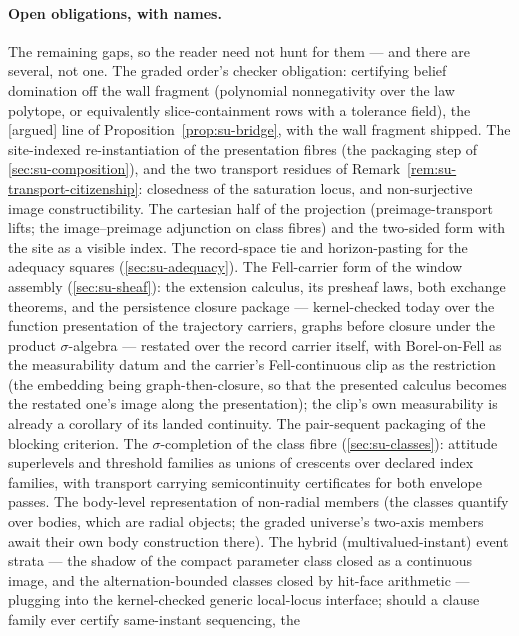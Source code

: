 \paragraph{Open obligations, with names.} The remaining gaps, so
the reader
need not hunt for them --- and there are several, not one. The
graded order's checker obligation: certifying belief domination
off the wall fragment (polynomial nonnegativity over the law
polytope, or equivalently slice-containment rows with a tolerance
field), the [argued] line of Proposition~\ref{prop:su-bridge},
with the wall fragment shipped. The site-indexed re-instantiation
of the presentation fibres (the packaging step of
\autoref{sec:su-composition}), and the two transport residues
of
Remark~\ref{rem:su-transport-citizenship}: closedness of the
saturation locus, and non-surjective image
constructibility. The cartesian half of the projection
(preimage-transport lifts; the image--preimage adjunction on class
fibres) and the two-sided form with the site as a visible index.
The record-space tie and horizon-pasting for the adequacy squares
(\autoref{sec:su-adequacy}). The Fell-carrier form of the window
assembly (\autoref{sec:su-sheaf}): the extension calculus, its
presheaf laws, both exchange theorems, and the persistence closure
package --- kernel-checked today over the function presentation of
the trajectory carriers, graphs before closure under the product
$\sigma$-algebra --- restated over the record carrier itself, with
Borel-on-Fell as the measurability datum and the carrier's
Fell-continuous clip as the restriction (the embedding being
graph-then-closure, so that the presented calculus becomes the
restated one's image along the presentation); the clip's own
measurability is already a corollary of its landed continuity. The
pair-sequent packaging of
the blocking criterion. The $\sigma$-completion of the class fibre
(\autoref{sec:su-classes}): attitude superlevels and threshold
families as unions of crescents over declared index families, with
transport carrying semicontinuity certificates for both envelope
passes. The body-level
representation of non-radial members (the classes quantify
over bodies, which are radial objects; the graded universe's
two-axis members await their own body construction there). The
hybrid (multivalued-instant) event strata --- the shadow of the
compact parameter class closed as a continuous image, and the
alternation-bounded classes closed by hit-face arithmetic ---
plugging into the kernel-checked generic local-locus interface;
should a clause family ever certify same-instant sequencing, the

